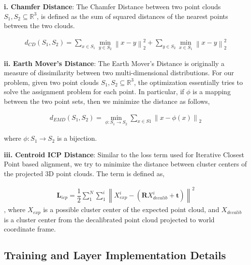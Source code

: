 \documentclass[letterpaper, 10 pt, conference]{ieeeconf}  %
\begin{document}
\textbf{i. Chamfer Distance}: The Chamfer Distance between two point clouds $S_1,S_2 \subseteq \mathbb{R}^3$, is defined as the sum of squared distances of the nearest points between the two clouds. 

\begin{equation}
\begin{split}
    d_{CD}(S_1,S_2) = \sum_{x \in S_1} \min_{y \in S_2} \left \| x - y \right \|_{2}^{2} + \sum_{y \in S_2} \min_{x \in S_1} \left \| x - y \right \|_{2}^{2}
\end{split}
\end{equation} 

\textbf{ii. Earth Mover's Distance}: The Earth Mover's Distance is originally a measure of dissimilarity between two multi-dimensional distributions. For our problem, given two point clouds $S_1,S_2 \subseteq \mathbb{R}^3$, the optimization essentially tries to solve the assignment problem for each point. In particular, if $\phi$ is a mapping between the two point sets, then we minimize the distance as follows, 


\begin{equation}
\begin{split}
    d_{EMD}(S_1,S_2) = \min_{\phi:S_1 \rightarrow S_2} \sum_{x \in S1} \left \| x - \phi(x) \right \|_{2}
\end{split}
\end{equation} 

where $\phi: S_1 \rightarrow S_2$ is a bijection.


\textbf{iii. Centroid ICP Distance}: Similar to the loss term used for Iterative Closest Point based alignment, we try to minimize the distance between cluster centers of the projected 3D point clouds. The term is defined as,

\begin{equation}
\begin{split}
    \mathbf{L}_{icp} = \dfrac{1}{2}\sum_{1}^{N} \sum_{1}^{i}\left \| X_{exp}^i - (\mathbf{R}X_{decalib}^i + \mathbf{t}) \right \|^2
\end{split}
\end{equation} 
, where $X_{exp}$ is a possible cluster center of the expected point cloud, and $X_{decalib}$ is a cluster center from the decalibrated point cloud projected to world coordinate frame.



\subsection{Training and Layer Implementation Details}
\end{document}
